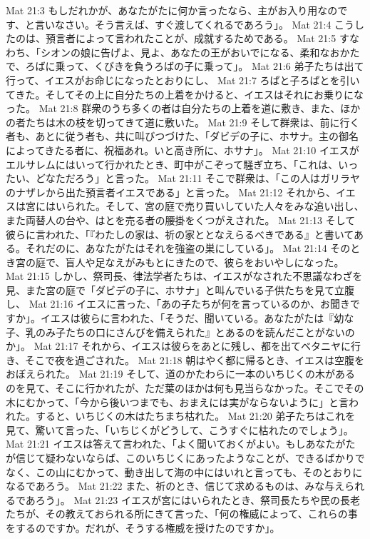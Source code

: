 Mat 21:3  もしだれかが、あなたがたに何か言ったなら、主がお入り用なのです、と言いなさい。そう言えば、すぐ渡してくれるであろう」。
Mat 21:4  こうしたのは、預言者によって言われたことが、成就するためである。
Mat 21:5  すなわち、「シオンの娘に告げよ、見よ、あなたの王がおいでになる、柔和なおかたで、ろばに乗って、くびきを負うろばの子に乗って」。
Mat 21:6  弟子たちは出て行って、イエスがお命じになったとおりにし、
Mat 21:7  ろばと子ろばとを引いてきた。そしてその上に自分たちの上着をかけると、イエスはそれにお乗りになった。
Mat 21:8  群衆のうち多くの者は自分たちの上着を道に敷き、また、ほかの者たちは木の枝を切ってきて道に敷いた。
Mat 21:9  そして群衆は、前に行く者も、あとに従う者も、共に叫びつづけた、「ダビデの子に、ホサナ。主の御名によってきたる者に、祝福あれ。いと高き所に、ホサナ」。
Mat 21:10  イエスがエルサレムにはいって行かれたとき、町中がこぞって騒ぎ立ち、「これは、いったい、どなただろう」と言った。
Mat 21:11  そこで群衆は、「この人はガリラヤのナザレから出た預言者イエスである」と言った。
Mat 21:12  それから、イエスは宮にはいられた。そして、宮の庭で売り買いしていた人々をみな追い出し、また両替人の台や、はとを売る者の腰掛をくつがえされた。
Mat 21:13  そして彼らに言われた、「『わたしの家は、祈の家ととなえらるべきである』と書いてある。それだのに、あなたがたはそれを強盗の巣にしている」。
Mat 21:14  そのとき宮の庭で、盲人や足なえがみもとにきたので、彼らをおいやしになった。
Mat 21:15  しかし、祭司長、律法学者たちは、イエスがなされた不思議なわざを見、また宮の庭で「ダビデの子に、ホサナ」と叫んでいる子供たちを見て立腹し、
Mat 21:16  イエスに言った、「あの子たちが何を言っているのか、お聞きですか」。イエスは彼らに言われた、「そうだ、聞いている。あなたがたは『幼な子、乳のみ子たちの口にさんびを備えられた』とあるのを読んだことがないのか」。
Mat 21:17  それから、イエスは彼らをあとに残し、都を出てベタニヤに行き、そこで夜を過ごされた。
Mat 21:18  朝はやく都に帰るとき、イエスは空腹をおぼえられた。
Mat 21:19  そして、道のかたわらに一本のいちじくの木があるのを見て、そこに行かれたが、ただ葉のほかは何も見当らなかった。そこでその木にむかって、「今から後いつまでも、おまえには実がならないように」と言われた。すると、いちじくの木はたちまち枯れた。
Mat 21:20  弟子たちはこれを見て、驚いて言った、「いちじくがどうして、こうすぐに枯れたのでしょう」。
Mat 21:21  イエスは答えて言われた、「よく聞いておくがよい。もしあなたがたが信じて疑わないならば、このいちじくにあったようなことが、できるばかりでなく、この山にむかって、動き出して海の中にはいれと言っても、そのとおりになるであろう。
Mat 21:22  また、祈のとき、信じて求めるものは、みな与えられるであろう」。
Mat 21:23  イエスが宮にはいられたとき、祭司長たちや民の長老たちが、その教えておられる所にきて言った、「何の権威によって、これらの事をするのですか。だれが、そうする権威を授けたのですか」。
